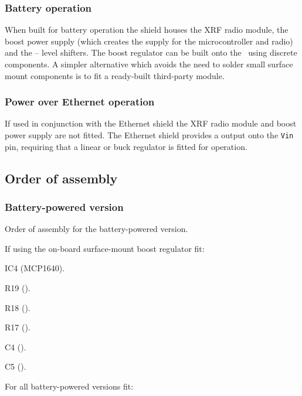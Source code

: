 \subsubsection{Battery operation}
When built for battery operation the shield houses the XRF radio
module, the boost power supply (which creates the  supply
for the microcontroller and radio) and the  -- 
level shifters. The boost regulator can be built onto the \pcb\ using
discrete components. A simpler alternative which avoids the need to
solder small surface mount components is to fit a ready-built
third-party module.


\subsubsection{Power over Ethernet operation}
If used in conjunction with the Ethernet shield the
XRF radio module and boost power supply are not fitted. The Ethernet
shield provides a  output onto the \texttt{Vin} pin,
requiring that a linear or buck regulator is fitted for  operation.

\subsection{Order of assembly}
\subsubsection{Battery-powered version}


Order of assembly for the battery-powered version.

If using the on-board surface-mount boost regulator fit:
\begin{buildorder}
\item IC4 (MCP1640).
\item R19 ().
\item R18 ().
\item R17 ().
\item C4 ().
\item C5 ().
\end{buildorder}

For all battery-powered versions fit:


